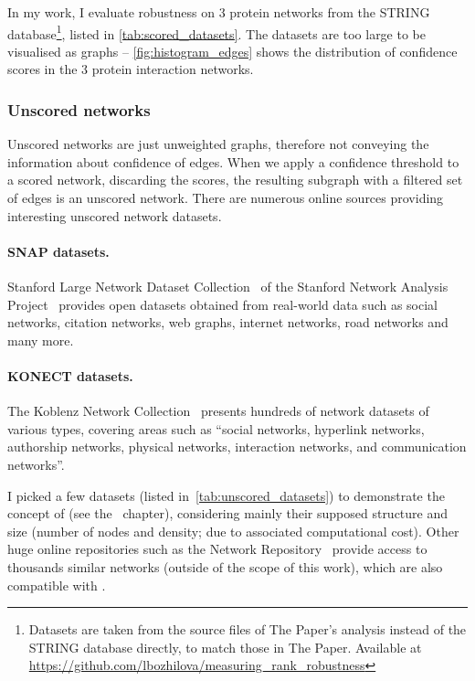 


In my work, I evaluate robustness on 3 protein networks from the STRING database\footnote{Datasets are taken from the source files of The Paper's analysis instead of the STRING database directly, to match those in The Paper. Available at \url{https://github.com/lbozhilova/measuring_rank_robustness}}, listed in \cref{tab:scored_datasets}.
The datasets are too large to be visualised as graphs -- \cref{fig:histogram_edges} shows the distribution of confidence scores in the 3 protein interaction networks.

\subsubsection*{Unscored networks}\label{sec:unscored_datasets}

Unscored networks are just unweighted graphs, therefore not conveying the information about confidence of edges.
When we apply a confidence threshold to a scored network, discarding the scores, the resulting subgraph with a filtered set of edges is an unscored network.
There are numerous online sources providing interesting unscored network datasets.

\paragraph*{SNAP datasets.} Stanford Large Network Dataset Collection~\cite{Large2016} of the Stanford Network Analysis Project~\cite{LeskovecSNAPGeneralPurpose2016} provides open datasets obtained from real-world data such as social networks, citation networks, web graphs, internet networks, road networks and many more.

\paragraph*{KONECT datasets.} The Koblenz Network Collection~\cite{Kunegis2013} presents hundreds of network datasets of various types, covering areas such as \enquote{social networks, hyperlink networks, authorship networks, physical networks, interaction networks, and communication networks}.

I picked a few datasets (listed in~\cref{tab:unscored_datasets}) to demonstrate the concept of \graffs (see the~ chapter), considering mainly their supposed structure and size (number of nodes and density; due to associated computational cost).
Other huge online repositories such as the Network Repository~\cite{RossiNetworkDataRepository2015} provide access to thousands similar networks (outside of the scope of this work), which are also compatible with \graffs.

